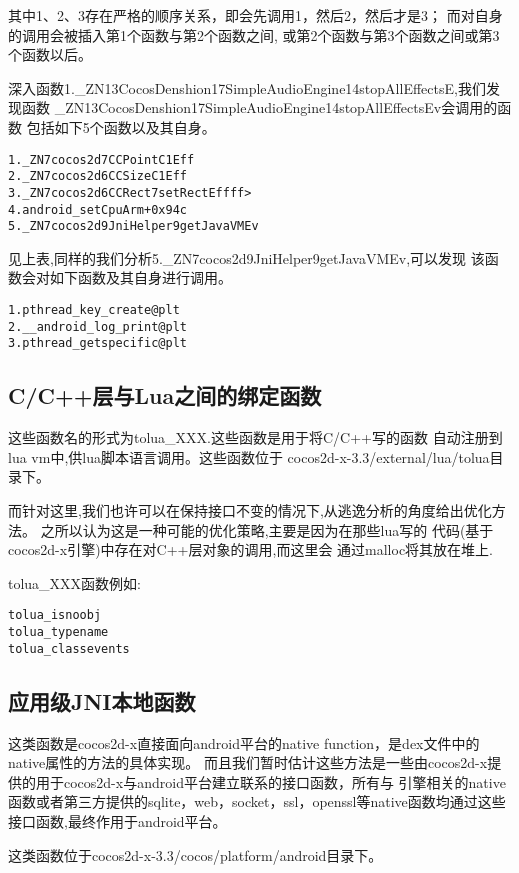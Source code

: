 其中1、2、3存在严格的顺序关系，即会先调用1，然后2，然后才是3；
而对自身的调用会被插入第1个函数与第2个函数之间,
或第2个函数与第3个函数之间或第3个函数以后。

深入函数1.\_ZN13CocosDenshion17SimpleAudioEngine14stopAllEffectsE,我们发现函数
\_ZN13CocosDenshion17SimpleAudioEngine14stopAllEffectsEv会调用的函数
包括如下5个函数以及其自身。
\begin{lstlisting}
1._ZN7cocos2d7CCPointC1Eff
2._ZN7cocos2d6CCSizeC1Eff
3._ZN7cocos2d6CCRect7setRectEffff>
4.android_setCpuArm+0x94c
5._ZN7cocos2d9JniHelper9getJavaVMEv
\end{lstlisting}

见上表,同样的我们分析5.\_ZN7cocos2d9JniHelper9getJavaVMEv,可以发现 
该函数会对如下函数及其自身进行调用。

\begin{lstlisting}
1.pthread_key_create@plt
2.__android_log_print@plt
3.pthread_getspecific@plt
\end{lstlisting}

\subsection{C/C++层与Lua之间的绑定函数}
\label{sec:so:bindlib}
这些函数名的形式为tolua\_XXX.这些函数是用于将C/C++写的函数
自动注册到lua vm中,供lua脚本语言调用。这些函数位于
cocos2d-x-3.3/external/lua/tolua目录下。

而针对这里,我们也许可以在保持接口不变的情况下,从逃逸分析的角度给出优化方法。
之所以认为这是一种可能的优化策略,主要是因为在那些lua写的
代码(基于cocos2d-x引擎)中存在对C++层对象的调用,而这里会
通过malloc将其放在堆上.

tolua\_XXX函数例如:\\
\begin{lstlisting}
tolua_isnoobj
tolua_typename
tolua_classevents
\end{lstlisting}

\subsection{应用级JNI本地函数}
\label{sec:so:appjnilib}
这类函数是cocos2d-x直接面向android平台的native function，是dex文件中的native属性的方法的具体实现。
而且我们暂时估计这些方法是一些由cocos2d-x提供的用于cocos2d-x与android平台建立联系的接口函数，所有与
引擎相关的native函数或者第三方提供的sqlite，web，socket，ssl，openssl等native函数均通过这些
接口函数,最终作用于android平台。

这类函数位于cocos2d-x-3.3/cocos/platform/android目录下。

